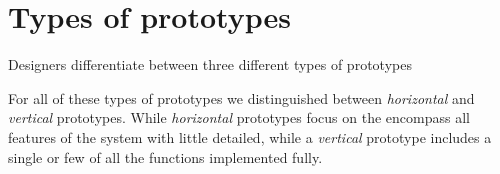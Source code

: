\section{Types of prototypes} \label{sec:types_of_prototypes}
Designers differentiate between three different types of prototypes





For all of these types of prototypes we distinguished between \emph{horizontal} and \emph{vertical} prototypes. While \emph{horizontal} prototypes focus on the encompass all features of the system with little detailed, while a \emph{vertical} prototype includes a single or few of all the functions implemented fully. \cite[p. 179]{benyon_14}
 

